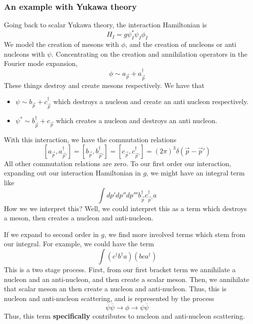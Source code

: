 \documentclass[11pt, oneside]{article}   	%
\theoremstyle{newline}
\theoremstyle{newline}
\theoremstyle{newline}
\theoremstyle{newline}
\theoremstyle{newline}
\begin{document}
\subsubsection{An example with Yukawa theory} 
Going back to scalar Yukawa theory, the interaction Hamiltonian is
\[
H_ I = g \psi _ I ^ * \psi _ I \phi _ I 
\] We model the creation of mesons with $ \phi $, and the creation of nucleons or anti nucleons with $ \psi $. 
Concentrating on the creation and annihilation operators in the 
Fourier mode expansion,
\[
\phi \sim a_{ \vec{p} } + a_{ \vec{p} }^ \dagger 
\] These things destroy and create mesons respectively. 
We have that 
\begin{itemize}
\item $ \psi \sim b_{ \vec{p} } + c_{ \vec{p} }^\dagger $ which destroys a nucleon and create an anti nucleon respectively. 
\item $ \psi ^ *  \sim b_{ \vec{p} } ^ \dagger + c_{ \vec{p} } $ which creates a nucleon and destroys an anti nucleon. 
\end{itemize}
With this interaction, we have the commutation 
relations 
\[
[ a_{ \vec{p} } , a_{ \vec{p} ' }^\dagger ] = [ b_{ \vec{p} }, b_{ \vec{p} ' }^ \dagger ] = [ c_{\vec{p} } , c_{ \vec{p}' }^\dagger ]  = ( 2 \pi ) ^ 3 \delta ( \vec{p} - \vec{p} ' ) 
\] All other commutation relations are zero. 
To our first order our interaction, expanding out 
our interaction Hamiltonian in $ g$, we might have an 
integral term like 
\[
\int dp' dp'' dp'''  b_{\vec{p}}^\dagger c_{\vec{p} ' }^\dagger a_{ }
\] How we we interpret this? 
Well, we could interpret this as a term which destroys 
a meson, then creates a nucleon and anti-nucleon. 

If we expand to second order in $ g$, 
we find more involved terms which stem from our integral. 
For example, we could have the term 
\[
\int ( c^ \dagger b^\dagger a ) ( b c  a^ \dagger ) 
\] This is a two stage process. 
First, from our first bracket term we annihilate a nucleon and an anti-nucleon, 
and then create a scalar meson. 
Then, we annihilate that scalar meson an then create a nucleon and anti-nucleon. 
Thus, this is nucleon and anti-nucleon scattering, and is 
represented by the process
\[
\psi \overline{\psi } \to \phi \to \psi \overline{\psi }
\] Thus, this term \textbf{specifically } contributes 
to nucleon and anti-nucleon scattering. 
\end{document}
